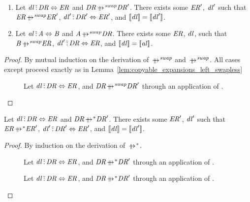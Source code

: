 \documentclass[numbers]{sigplanconf}
\begin{document}
\begin{lemma}
  \label{lem:copyable_expansions_left_swap}\leavevmode
  \begin{enumerate}
  \item Let $\mathit{dl} \,\tilde{:}\, \mathit{DR} \Leftrightarrow
    \mathit{ER}$ and $\DNFRegex \ParallelRewriteSwap \DNFRegex'$.  There exists some
    $\mathit{ER}'$, $\mathit{dl}'$ such that $\DNFRegexAlt \ParallelRewriteSwap
    \DNFRegexAlt'$,
    $\mathit{dl}' \,\tilde{:}\,
    \mathit{DR}' \Leftrightarrow \mathit{ER}'$, and $[ \! [\mathit{dl}] \! ] =
    [ \! [\mathit{dl}'] \! ]$.
  \item Let $\mathit{al} \,\tilde{:}\, \mathit{A} \Leftrightarrow \mathit{B}$ and
    $\Atom \ParallelRewriteSwapAtom \DNFRegex$.  There exists some $\mathit{ER}$,
    $\mathit{dl}$, such that $\AtomAlt \ParallelRewriteSwapAtom \DNFRegexAlt$,
    $\mathit{dl}' \,\tilde{:}\, \mathit{DR}
    \Leftrightarrow \mathit{ER}$, and $[ \! [\mathit{dl}] \! ] =
    [ \! [\mathit{al}] \! ]$.
  \end{enumerate}
\end{lemma}
\begin{proof}
  By mutual induction on the derivation of $\ParallelRewriteSwap$ and
  $\ParallelRewriteSwapAtom$.  All cases except \DNFReorderRule{} proceed
  exactly as in Lemma~\ref{lem:copyable_expansions_left_swapless}
  \begin{description}
  \item[\DNFReorderRule{}]
    Let $\mathit{dl} \,\tilde{:}\, \mathit{DR} \Leftrightarrow \mathit{ER}$, and
    $\DNFRegex\ParallelRewriteSwap\DNFRegex'$ through an application of
    \DNFReorderRule{}.
  \end{description}
\end{proof}

\begin{lemma}
  \label{lem:copyable_expansions_left_swapless_star}\leavevmode
  Let $\mathit{dl} \,\tilde{:}\, \mathit{DR} \Leftrightarrow
  \mathit{ER}$ and $\DNFRegex \StarOf{\ParallelRewrite} \DNFRegex'$.  There
  exists some
  $\mathit{ER}'$, $\mathit{dl}'$ such that $\DNFRegexAlt
  \StarOf{\ParallelRewrite} \DNFRegexAlt'$,
  $\mathit{dl}' \,\tilde{:}\,
  \mathit{DR}' \Leftrightarrow \mathit{ER}'$, and $[ \! [\mathit{dl}] \! ] =
  [ \! [\mathit{dl}'] \! ]$.
\end{lemma}
\begin{proof}
  By induction on the derivation of $\StarOf{\ParallelRewrite}$.
  \begin{description}
  \item[\ReflexivityRule{}]
    Let $\mathit{dl} \,\tilde{:}\, \mathit{DR} \Leftrightarrow \mathit{ER}$, and
    $\DNFRegex\StarOf{\ParallelRewrite}\DNFRegex'$ through an application of
    \DNFReorderRule{}.
  \item[\TransitivityRule{}]
    Let $\mathit{dl} \,\tilde{:}\, \mathit{DR} \Leftrightarrow \mathit{ER}$, and
    $\DNFRegex\StarOf{\ParallelRewrite}\DNFRegex'$ through an application of
    \DNFReorderRule{}.
  \end{description}
\end{proof}
\end{document}
